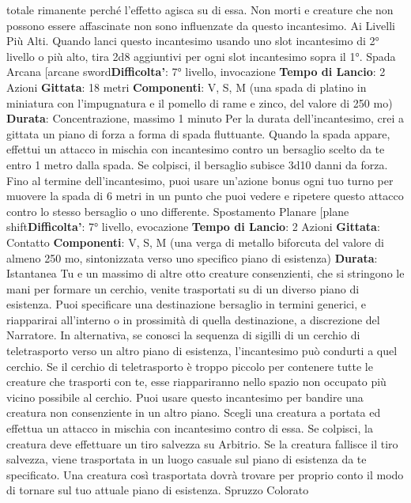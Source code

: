 \begin{multicols}{2}
totale rimanente perché l’effetto agisca su di essa.
Non morti e creature che non possono essere
affascinate non sono influenzate da questo
incantesimo.
Ai Livelli Più Alti. Quando lanci questo incantesimo
usando uno slot incantesimo di 2° livello o più alto, tira
2d8 aggiuntivi per ogni slot incantesimo sopra il 1°.
Spada Arcana
[arcane sword\textbf{Difficolta'}:
7° livello, invocazione
\textbf{Tempo di Lancio}: 2 Azioni
\textbf{Gittata}: 18 metri
\textbf{Componenti}: V, S, M (una spada di platino in miniatura
con l’impugnatura e il pomello di rame e zinco, del
valore di 250 mo)
\textbf{Durata}: Concentrazione, massimo 1 minuto
Per la durata dell’incantesimo, crei a gittata un piano di
forza a forma di spada fluttuante.
Quando la spada appare, effettui un attacco in mischia
con incantesimo contro un bersaglio scelto da te entro
1 metro dalla spada. Se colpisci, il bersaglio subisce
3d10 danni da forza. Fino al termine dell’incantesimo,
puoi usare un’azione bonus ogni tuo turno per muovere
la spada di 6 metri in un punto che puoi vedere e
ripetere questo attacco contro lo stesso bersaglio o uno
differente.
Spostamento Planare
[plane shift\textbf{Difficolta'}:
7° livello, evocazione
\textbf{Tempo di Lancio}: 2 Azioni
\textbf{Gittata}: Contatto
\textbf{Componenti}: V, S, M (una verga di metallo biforcuta
del valore di almeno 250 mo, sintonizzata verso uno
specifico piano di esistenza)
\textbf{Durata}: Istantanea
Tu e un massimo di altre otto creature consenzienti,
che si stringono le mani per formare un cerchio, venite
trasportati su di un diverso piano di esistenza. Puoi
specificare una destinazione bersaglio in termini
generici, e riapparirai all’interno o in prossimità di quella
destinazione, a discrezione del Narratore.
In alternativa, se conosci la sequenza di sigilli di un
cerchio di teletrasporto verso un altro piano di
esistenza, l’incantesimo può condurti a quel cerchio. Se
il cerchio di teletrasporto è troppo piccolo per contenere
tutte le creature che trasporti con te, esse riappariranno
nello spazio non occupato più vicino possibile al
cerchio.
Puoi usare questo incantesimo per bandire una
creatura non consenziente in un altro piano. Scegli una
creatura a portata ed effettua un attacco in mischia con
incantesimo contro di essa. Se colpisci, la creatura
deve effettuare un tiro salvezza su Arbitrio. Se la
creatura fallisce il tiro salvezza, viene trasportata in un
luogo casuale sul piano di esistenza da te specificato.
Una creatura così trasportata dovrà trovare per proprio
conto il modo di tornare sul tuo attuale piano di
esistenza.
Spruzzo Colorato

\end{multicols}
